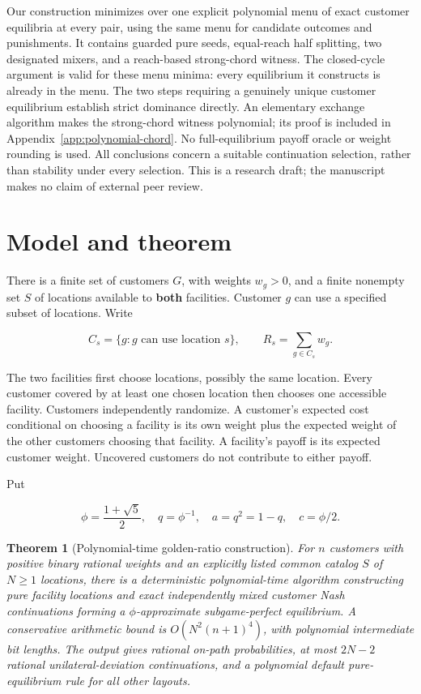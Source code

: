 \documentclass[11pt,a4paper]{article}
\newtheorem{theorem}{Theorem}
\begin{document}
Our construction minimizes over one explicit polynomial menu of exact customer
equilibria at every pair, using the same menu for candidate outcomes and
punishments. It contains guarded pure seeds, equal-reach half splitting,
two designated mixers, and a reach-based strong-chord witness. The closed-cycle
argument is valid for these menu minima: every equilibrium it constructs is
already in the menu. The two steps requiring a genuinely unique customer
equilibrium establish strict dominance directly. An elementary exchange
algorithm makes the strong-chord witness polynomial; its proof is included
in Appendix~\ref{app:polynomial-chord}. No full-equilibrium payoff oracle or
weight rounding is used. All conclusions concern a suitable continuation
selection, rather than stability under every selection. This is a research
draft; the manuscript makes no claim of external peer review.

\hypertarget{model-and-theorem}{%
\section{Model and theorem}\label{model-and-theorem}}

There is a finite set of customers \(G\), with weights \(w_g>0\), and a finite nonempty set \(S\) of locations available to \textbf{both} facilities. Customer \(g\) can use a specified subset of locations. Write

\[
C_s=\{g:g\text{ can use location }s\},\qquad R_s=\sum_{g\in C_s}w_g.
\]

The two facilities first choose locations, possibly the same location. Every customer covered by at least one chosen location then chooses one accessible facility. Customers independently randomize. A customer's expected cost conditional on choosing a facility is its own weight plus the expected weight of the other customers choosing that facility. A facility's payoff is its expected customer weight. Uncovered customers do not contribute to either payoff.

Put

\[
\phi=\frac{1+\sqrt5}{2},\quad q=\phi^{-1},\quad a=q^2=1-q,
\quad c=\phi/2.
\]

\begin{theorem}[Polynomial-time golden-ratio construction]\label{thm:main}
For $n$ customers with positive binary rational weights and an explicitly
listed common catalog $S$ of $N\ge1$ locations, there is a deterministic
polynomial-time algorithm constructing pure facility locations and exact
independently mixed customer Nash continuations forming a
$\phi$-approximate subgame-perfect equilibrium.
A conservative arithmetic bound is $O(N^2(n+1)^4)$, with polynomial
intermediate bit lengths. The output gives rational on-path probabilities,
at most $2N-2$ rational unilateral-deviation continuations, and a polynomial
default pure-equilibrium rule for all other layouts.
\end{theorem}
\end{document}
